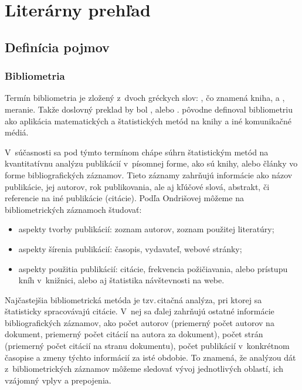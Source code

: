 \chapter{Literárny prehľad}
\label{chap:review}

\section{Definícia pojmov}

\subsection{Bibliometria}

Termín bibliometria je zložený z~dvoch gréckych slov:
, čo znamená kniha, a
, meranie.  Takže doslovný
preklad by bol , alebo .
\citet{Pritchard1969} pôvodne definoval bibliometriu ako aplikácia matematických
a štatistických metód na knihy a iné komunikačné médiá.

V~súčasnosti sa pod týmto termínom chápe súhrn štatistickým metód na
kvantitatívnu analýzu publikácií v~písomnej forme, ako sú knihy, alebo články vo
forme bibliografických záznamov.  Tieto záznamy zahrňujú informácie ako názov
publikácie, jej autorov, rok publikovania, ale aj kľúčové slová, abstrakt, či
referencie na iné publikácie (citácie).  Podľa Ondrišovej
\citeyearpar{Ondrisova2011} môžeme na bibliometrických záznamoch študovať:

\begin{itemize}
\item aspekty tvorby publikácií: zoznam autorov, zoznam použitej literatúry;
\item aspekty šírenia publikácií: časopis, vydavateľ, webové stránky;
\item aspekty použitia publikácií: citácie, frekvencia požičiavania, alebo
  prístupu kníh v~knižnici, alebo aj štatistika návštevnosti na webe.

\end{itemize}

Najčastejšia bibliometrická metóda je tzv.\,citačná analýza, pri ktorej sa štatisticky spracovávajú citácie.  V~nej sa ďalej
zahrňujú ostatné informácie bibliografických záznamov, ako počet autorov
(priemerný počet autorov na dokument, priemerný počet citácií na autora za
dokument), počet strán (priemerný počet citácií na stranu dokumentu), počet
publikácií v~konkrétnom časopise a zmeny týchto informácií za isté obdobie.  To
znamená, že analýzou dát z~bibliometrických záznamov môžeme sledovať vývoj
jednotlivých oblastí, ich vzájomný vplyv a prepojenia.

